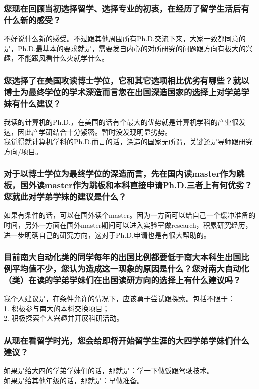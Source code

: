 \documentclass[a4paper,UTF8]{book}
\begin{document}
    \subsubsection*{您现在回顾当初选择留学、选择专业的初衷，在经历了留学生活后有什么新的感受？}
    不好说什么新的感受。不过跟其他周围所有Ph.D.交流下来，大家一致都同意的是，Ph.D.最基本的要求就是，需要发自内心的对所研究的问题跟方向有极大的兴趣，不能跟风看什么火就学什么。

    \subsubsection*{您选择了在美国攻读博士学位，它和其它选项相比优劣有哪些？就以博士为最终学位的学术深造而言您在出国深造国家的选择上对学弟学妹有什么建议？}
    我读的计算机的Ph.D.，在美国的话有个最大的优势就是计算机学科的产业很发达，因此产学研结合十分紧密。暂时没发现明显劣势。\\
    我觉得就计算机学科的Ph.D.而言的话，深造的国家无所谓，关键还是导师跟研究方向/项目。

    \subsubsection*{对于以博士学位为最终学位的深造而言，先在国内读master作为跳板，国外读master作为跳板和本科直接申请Ph.D.三者上有何优劣？您就此对学弟学妹的建议是什么？}
    如果有条件的话，可以在国外读个master。因为一方面可以给自己一个缓冲准备的时间，另外一方面在国外master期间可以进入实验室做research，积累研究经历，进一步明确自己的研究方向，这对于Ph.D.申请也是有很大帮助的。

    \subsubsection*{目前南大自动化类的同学每年的出国比例都要低于南大本科生出国比例平均值不少，您认为造成这一现象的原因是什么？您对南大自动化（类）在读的学弟学妹们在出国读研方向的选择上有什么建议吗？}
    我个人建议是，在条件允许的情况下，应该勇于尝试跟探索。包括不限于：\\1. 积极参与南大的本科交换项目；\\2. 积极探索个人兴趣并开展科研活动。

    \subsubsection*{从现在看留学时光，您会给即将开始留学生涯的大四学弟学妹们什么建议？}
    如果是给大四的学弟学妹们的话，那就是：学一下做饭跟驾驶技术。\\
    如果是给其他年级的话，那就是：早做准备。
\end{document}
